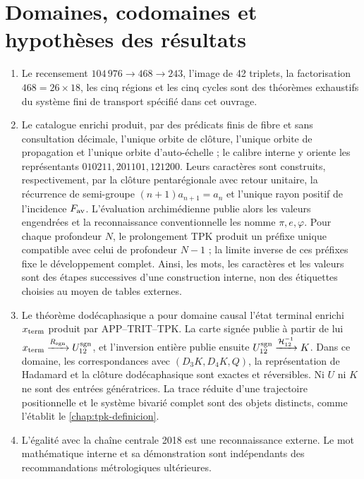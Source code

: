 \chapter{Domaines, codomaines et hypothèses des résultats}
\label{app:premisas}

\begin{enumerate}
\item Le recensement \(104\,976\to468\to243\), l'image de 42 triplets, la
factorisation \(468=26\times18\), les cinq régions et les cinq cycles sont des
théorèmes exhaustifs du système fini de transport spécifié dans cet
ouvrage.

\item Le catalogue enrichi produit, par des prédicats finis de fibre et sans
consultation décimale, l'unique orbite de clôture, l'unique orbite de
propagation et l'unique orbite d'auto-échelle ; le calibre interne y oriente
les représentants \(010211,201101,121200\). Leurs caractères sont
construits, respectivement, par la clôture pentarégionale avec retour
unitaire, la récurrence de semi-groupe \((n+1)a_{n+1}=a_n\) et l'unique rayon positif
de l'incidence \(F_{\rm av}\). L'évaluation archimédienne publie
alors les valeurs engendrées et la reconnaissance conventionnelle les nomme
\(\pi,e,\varphi\). Pour chaque profondeur \(N\), le prolongement TPK produit
un préfixe unique compatible avec celui de profondeur \(N-1\) ; la limite
inverse de ces préfixes fixe le développement complet. Ainsi, les mots,
les caractères et les valeurs sont des étapes successives d'une construction
interne, non des étiquettes choisies au moyen de tables externes.

\item Le théorème dodécaphasique a pour domaine causal l'état terminal
enrichi \(x_{\rm term}\) produit par APP--TRIT--TPK. La carte signée
publie à partir de lui
\(x_{\rm term}\xrightarrow{R_{\rm sgn}}U_{12}^{\rm sgn}\), et l'inversion
entière publie ensuite
\(U_{12}^{\rm sgn}\xrightarrow{\mathcal H_{12}^{-1}}K\). Dans ce domaine,
les correspondances avec \((D_3K,D_4K,Q)\), la représentation de Hadamard et
la clôture dodécaphasique sont exactes et réversibles. Ni \(U\) ni \(K\) ne sont des
entrées génératrices. La trace réduite d'une trajectoire positionnelle et le
système bivarié complet sont des objets distincts, comme l'établit le
\cref{chap:tpk-definicion}.

\item L'égalité avec la chaîne centrale 2018 est une reconnaissance externe.
Le mot mathématique interne et sa démonstration sont indépendants des
recommandations métrologiques ultérieures.


\end{enumerate}
